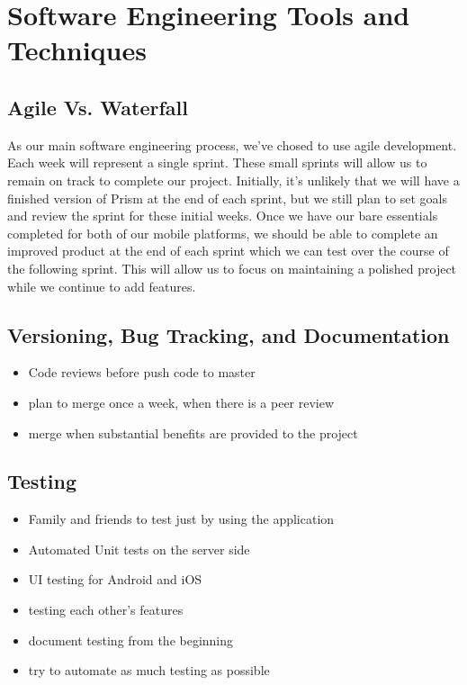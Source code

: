 \documentclass[12pt]{article}
\begin{document}
\section{Software Engineering Tools and Techniques}
\subsection{Agile Vs. Waterfall}
As our main software engineering process, we've chosed to use agile development. Each week will represent a single sprint. These small sprints will allow us to remain on track to complete our project. Initially, it's unlikely that we will have a finished version of Prism at the end of each sprint, but we still plan to set goals and review the sprint for these initial weeks. Once we have our bare essentials completed for both of our mobile platforms, we should be able to complete an improved product at the end of each sprint which we can test over the course of the following sprint. This will allow us to focus on maintaining a polished project while we continue to add features.
\subsection{Versioning, Bug Tracking, and Documentation}
\begin{itemize}
\item Code reviews before push code to master
\item plan to merge once a week, when there is a peer review
\item merge when substantial benefits are provided to the project
\end{itemize}
\subsection{Testing}
\begin{itemize}
\item Family and friends to test just by using the application
\item Automated Unit tests on the server side
\item UI testing for Android and iOS
\item testing each other's features
\item document testing from the beginning
\item try to automate as much testing as possible
\end{itemize}
\end{document}
